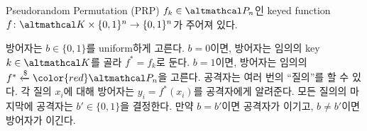 \documentclass[../250428_msquare_provable_security.tex]{subfiles}
\begin{document}
\begin{frame}{Pseudorandom Permutation (PRP)}
    \(f_k \in \mcal{P}_n\)인 keyed function \(f \colon \mcal{K} \times \{0,1\}^n \to \{0,1\}^n\)가
    주어져 있다.

    \pause
    \begin{enumerate}
        \ii
        방어자는 \(b \in \{0,1\}\)를 uniform하게 고른다.
        \ii
        \(b = 0\)이면, 방어자는
        임의의 key \(k \in \mcal{K}\)를 골라 \(f^\ast = f_k\)로 둔다.
        \ii
        \(b = 1\)이면, 방어자는 임의의 \(f^\ast \dgets {\color{red}\mcal{P}_n}\)을 고른다.
        \ii
        공격자는 여러 번의 ``질의''를 할 수 있다.
        각 질의 \(x_i\)에 대해 방어자는 \(y_i = f^\ast(x_i)\)를 공격자에게 알려준다.
        \ii
        모든 질의의 마지막에 공격자는 \(b' \in \{0,1\}\)을 결정한다.
        만약 \(b = b'\)이면 공격자가 이기고, \(b \neq b'\)이면 방어자가 이긴다.
    \end{enumerate}

\end{frame}
\end{document}
